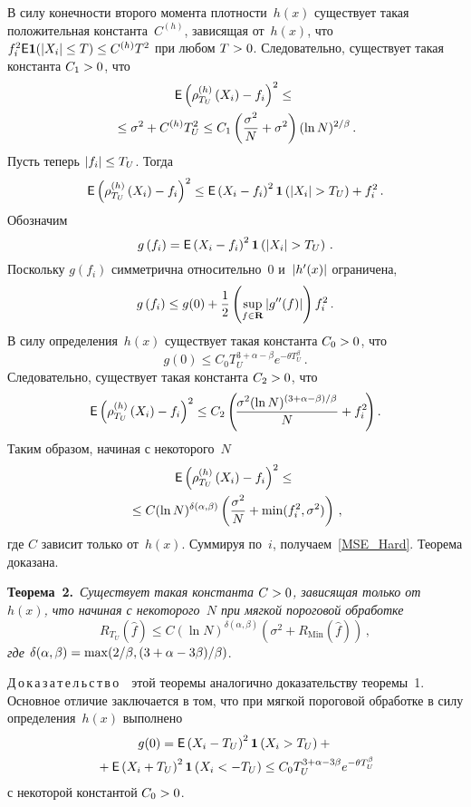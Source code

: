 \begin{multicols}{2}
В силу конечности второго момента плот\-ности~$h(x)$ существует 
такая положительная константа~$C^{(h)}$, зависящая от~$h(x)$, что 
$f_i^2\e\It(\abs{X_i}\hm\leq T)\hm\leq C^{(h)}T^2$ при любом $T\hm>0$. Следовательно, 
существует такая константа $C_1\hm>0$, что
\begin{multline*}
{\sf E}\left(\rho_{T_U}^{(h)}\left(X_i\right)-f_i\right)^2\leq {}\\
{}\leq
\sigma^2+C^{(h)}T_U^2\leq C_1\left(\displaystyle\frac{\displaystyle \sigma^2\mathstrut}{\displaystyle N\mathstrut}+\sigma^2\right)
(\ln N)^{2/\beta}\,.
\end{multline*}
Пусть теперь $\abs{f_i}\hm\leq T_U$. Тогда
$$
{\sf E}\left(\rho_{T_U}^{(h)}\left(X_i\right)-f_i\right)^2\leq{\sf E}\left(X_i-f_i\right)^2\mathbf{1}
\left(\left\vert X_i\right\vert> T_U\right)+f_i^2\,.
$$
Обозначим
$$
g\left(f_i\right)={\sf E}\left(X_i-f_i\right)^2\mathbf{1}\left(\left\vert X_i\right\vert> T_U\right)\,.
$$
Поскольку $g(f_i)$ симметрична относительно~0 и~$\left\vert h'(x)\right\vert$ ограничена,
$$
g\left(f_i\right)\leq g(0)+\displaystyle\frac{\displaystyle 1\mathstrut}{\displaystyle 2\mathstrut}\left(\sup\limits_{f\in{\mathbf R}}
\left\vert g''(f)\right\vert\right)f_i^2\,.
$$
В силу определения~$h(x)$ существует такая константа $C_0\hm>0$, что
$$
g(0)\leq C_0T_U^{3+\alpha-\beta}e^{-\theta T_U^{\beta}}\,.
$$
Следовательно, существует такая константа $C_2\hm>0$, что
$$
{\sf E}\left(\rho_{T_U}^{(h)}\left(X_i\right)-f_i\right)^2\leq 
C_2 \left(\!\displaystyle\frac{\displaystyle \sigma^2(\ln N)^{({3+\alpha-\beta})/{\beta}}\mathstrut}{\displaystyle N\mathstrut}+f_i^2\!\right).
$$
Таким образом, начиная с некоторого~$N$
\begin{multline*}
{\sf E}\left(\rho_{T_U}^{(h)}\left(X_i\right)-f_i\right)^2\leq {}\\
{}\leq
C (\ln N)^{\delta(\alpha,\beta)}\left(\displaystyle\frac{\displaystyle \sigma^2\mathstrut}{\displaystyle N\mathstrut}+\min(f_i^2,\sigma^2)\right)\,,
\end{multline*}
где $C$ зависит только от~$h(x)$. Суммируя по~$i$, получаем~\eqref{MSE_Hard}. 
Теорема доказана.

\smallskip

\noindent
\textbf{Теорема~2.}\ \textit{Существует такая константа $C\hm>0$, зависящая только 
от~$h(x)$, что начиная с некоторого~$N$ при мягкой пороговой обработке}
\begin{equation}
\label{MSE_Soft}
R_{T_U}\left(\hat{f}\right)\leq C(\ln N)^{\delta(\alpha,\beta)}\left(\sigma^2+R_{\mathrm{Min}}
\left(\hat{f}\right)\right)\,,
\end{equation}
\textit{где} $\delta(\alpha,\beta)\hm=\max({2}/{\beta},({3+\alpha-3\beta})/{\beta})$.

\smallskip

\noindent
Д\,о\,к\,а\,з\,а\,т\,е\,л\,ь\,с\,т\,в\,о\ \ 
этой теоремы аналогично доказательству теоремы~1. Основное отличие заключается в том, 
что при мягкой пороговой обработке в силу определения~$h(x)$ выполнено
\begin{multline*}
g(0)={\sf E}\left(X_i-T_U\right)^2\mathbf{1}\left(X_i>T_U\right)+{}\\
{}+
{\sf E}\left(X_i+T_U\right)^2\mathbf{1}\left(X_i<-T_U\right)\leq 
C_0T_U^{3+\alpha-3\beta}e^{-\theta T_U^{\beta}}
\end{multline*}
с некоторой константой $C_0\hm>0$.


\end{multicols}
